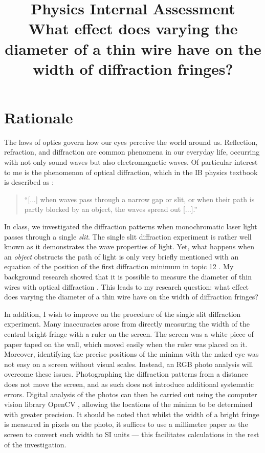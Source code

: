 \documentclass[a4paper, 12pt]{article}
\title{
\textbf{Physics Internal Assessment}\\
\bigskip
What effect does varying the diameter of a thin wire have on the width of diffraction fringes?
}
\author{}
\date{}
\begin{document}
\maketitle

\section{Rationale}
The laws of optics govern how our eyes perceive the world around us. 
Reflection, refraction, and diffraction are common phenomena in our everyday life, occurring with not only sound waves but also electromagnetic waves. 
Of particular interest to me is the phenomenon of optical diffraction, which in the IB physics textbook is described as \autocite[151]{textbook}: 
\begin{quote}
``[...] when waves pass through a narrow gap or slit, or when their path is partly blocked by an object, the waves spread out [...].''    
\end{quote}

In class, we investigated the diffraction patterns when monochromatic laser light passes through a single \textit{slit}. 
The single slit diffraction experiment is rather well known as it demonstrates the wave properties of light. 
Yet, what happens when an \textit{object} obstructs the path of light is only very briefly mentioned with an equation of the position of the first diffraction minimum in topic 12 \autocite[495]{textbook}. 
My background research showed that it is possible to measure the diameter of thin wires with optical diffraction \autocite{wire_measurement}. 
This leads to my research question: 
what effect does varying the diameter of a thin wire have on the width of diffraction fringes?

In addition, I wish to improve on the procedure of the single slit diffraction experiment.
Many inaccuracies arose from directly measuring the width of the central bright fringe with a ruler on the screen.
The screen was a white piece of paper taped on the wall, which moved easily when the ruler was placed on it. 
Moreover, identifying the precise positions of the minima with the naked eye was not easy on a screen without visual scales.
Instead, an RGB photo analysis will overcome these issues.
Photographing the diffraction patterns from a distance does not move the screen, and as such does not introduce additional systematic errors.
Digital analysis of the photos can then be carried out using the computer vision library OpenCV \autocite{opencv_library}, allowing the locations of the minima to be determined with greater precision.
It should be noted that whilst the width of a bright fringe is measured in pixels on the photo, it suffices to use a millimetre paper as the screen to convert such width to SI units --- this facilitates calculations in the rest of the investigation.
\end{document}
